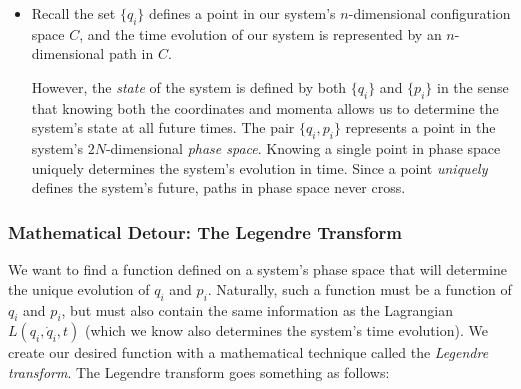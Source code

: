 \documentclass[11pt, a4paper]{article}
\begin{document}
\begin{itemize}
	\item Recall the set $ \{q_{i}\} $ defines a point in our system's $ n $-dimensional configuration space $ C $, and the time evolution of our system is represented by an $ n $-dimensional path in $ C $.
	
	However, the \textit{state} of the system is defined by both $ \{q_{i}\} $ and $ \{p_{i}\} $ in the sense that knowing both the coordinates and momenta allows us to determine the system's state at all future times. The pair $ \{q_{i}, p_{i} \} $ represents a point in the system's $ 2N $-dimensional \textit{phase space}. Knowing a single point in phase space  uniquely determines the system's evolution in time. Since a point \textit{uniquely} defines the system's future, paths in phase space never cross.
\end{itemize}

\subsubsection{Mathematical Detour: The Legendre Transform}
We want to find a function defined on a system's phase space that will determine the unique evolution of $ q_{i} $ and $ p_{i} $. Naturally, such a function must be a function of $ q_{i} $ and $ p_{i} $, but must also contain the same information as the Lagrangian $ L(q_{i}, \dot{q}_{i}, t) $ (which we know also determines the system's time evolution). We create our desired function with a mathematical technique called the \textit{Legendre transform}. The Legendre transform goes something as follows:
\end{document}
